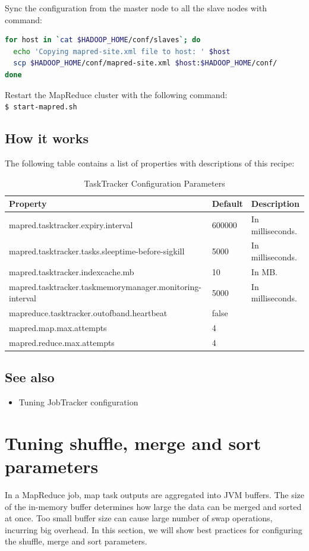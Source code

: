 Sync the configuration from the master node to all the slave nodes with command:
\lstset{style=bashstyle}
\begin{lstlisting}[language=bash]
for host in `cat $HADOOP_HOME/conf/slaves`; do
  echo 'Copying mapred-site.xml file to host: ' $host
  scp $HADOOP_HOME/conf/mapred-site.xml $host:$HADOOP_HOME/conf/
done
\end{lstlisting}

Restart the MapReduce cluster with the following command: \\
\verb|$ start-mapred.sh|

\subsection*{How it works}
The following table contains a list of properties with descriptions of this recipe:
\begin{table}[ht]
  \centering
  \begin{tabular}{lll}
    \toprule
    \textbf{Property} & \textbf{Default} &  \textbf{Description}  \\ \midrule
      mapred.tasktracker.expiry.interval & 600000 & In milliseconds. \\
      mapred.tasktracker.tasks.sleeptime-before-sigkill & 5000 & In milliseconds. \\
      mapred.tasktracker.indexcache.mb & 10 & In MB. \\
      mapred.tasktracker.taskmemorymanager.monitoring-interval & 5000 & In milliseconds. \\
      mapreduce.tasktracker.outofband.heartbeat & false &  \\
      mapred.map.max.attempts & 4 & \\
      mapred.reduce.max.attempts & 4 &  \\ \bottomrule
  \end{tabular}
  \caption{TaskTracker Configuration Parameters}\label{tbl:tasktracker}
\end{table}

\subsection*{See also}
\begin{itemize}
  \item Tuning JobTracker configuration
\end{itemize}
\section{Tuning shuffle, merge and sort parameters}
In a MapReduce job, map task outputs are aggregated into JVM buffers. The size of the in-memory buffer determines how large the data can be merged and sorted at once. Too small buffer size can cause large number of swap operations, incurring big overhead. In this section, we will show best practices for configuring the shuffle, merge and sort parameters.
